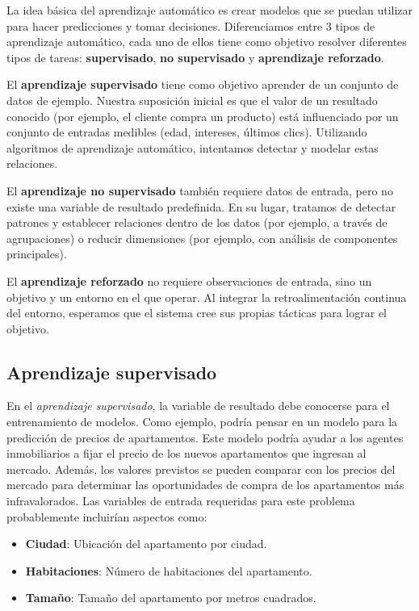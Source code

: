 \documentclass[
]{book}
\providecommand{\tightlist}{%
  \setlength{\itemsep}{0pt}\setlength{\parskip}{0pt}}
\begin{document}
La idea básica del aprendizaje automático es crear modelos que se puedan utilizar para hacer predicciones y tomar decisiones. Diferenciamos entre 3 tipos de aprendizaje automático, cada uno de ellos tiene como objetivo resolver diferentes tipos de tareas: \textbf{supervisado}, \textbf{no supervisado} y \textbf{aprendizaje reforzado}.

El \textbf{aprendizaje supervisado} tiene como objetivo aprender de un conjunto de datos de ejemplo. Nuestra suposición inicial es que el valor de un resultado conocido (por ejemplo, el cliente compra un producto) está influenciado por un conjunto de entradas medibles (edad, intereses, últimos clics). Utilizando algoritmos de aprendizaje automático, intentamos detectar y modelar estas relaciones.

El \textbf{aprendizaje no supervisado} también requiere datos de entrada, pero no existe una variable de resultado predefinida. En su lugar, tratamos de detectar patrones y establecer relaciones dentro de los datos (por ejemplo, a través de agrupaciones) o reducir dimensiones (por ejemplo, con análisis de componentes principales).

El \textbf{aprendizaje reforzado} no requiere observaciones de entrada, sino un objetivo y un entorno en el que operar. Al integrar la retroalimentación continua del entorno, esperamos que el sistema cree sus propias tácticas para lograr el objetivo.

\hypertarget{aprendizaje-supervisado}{%
\subsection{Aprendizaje supervisado}\label{aprendizaje-supervisado}}

En el \emph{aprendizaje supervisado}, la variable de resultado debe conocerse para el entrenamiento de modelos. Como ejemplo, podría pensar en un modelo para la predicción de precios de apartamentos. Este modelo podría ayudar a los agentes inmobiliarios a fijar el precio de los nuevos apartamentos que ingresan al mercado. Además, los valores previstos se pueden comparar con los precios del mercado para determinar las oportunidades de compra de los apartamentos más infravalorados. Las variables de entrada requeridas para este problema probablemente incluirían aspectos como:

\begin{itemize}
\tightlist
\item
  \textbf{Ciudad}: Ubicación del apartamento por ciudad.
\item
  \textbf{Habitaciones}: Número de habitaciones del apartamento.
\item
  \textbf{Tamaño}: Tamaño del apartamento por metros cuadrados.
\end{itemize}
\end{document}
